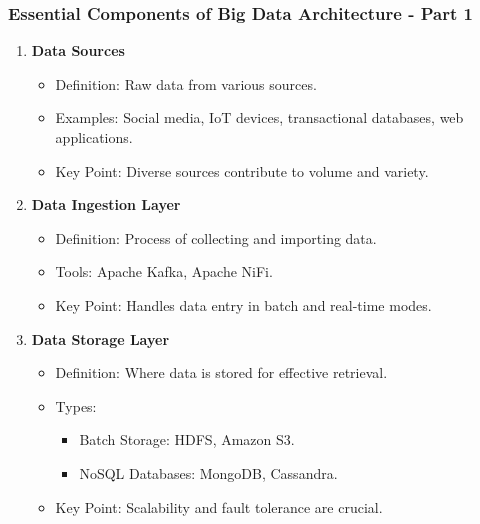 \documentclass[aspectratio=169]{beamer}
\begin{document}
\begin{frame}[fragile]
    \frametitle{Essential Components of Big Data Architecture - Part 1}
    \begin{enumerate}
        \item \textbf{Data Sources}
            \begin{itemize}
                \item Definition: Raw data from various sources.
                \item Examples: Social media, IoT devices, transactional databases, web applications.
                \item Key Point: Diverse sources contribute to volume and variety.
            \end{itemize}
        
        \item \textbf{Data Ingestion Layer}
            \begin{itemize}
                \item Definition: Process of collecting and importing data.
                \item Tools: Apache Kafka, Apache NiFi.
                \item Key Point: Handles data entry in batch and real-time modes.
            \end{itemize}
        
        \item \textbf{Data Storage Layer}
            \begin{itemize}
                \item Definition: Where data is stored for effective retrieval.
                \item Types: 
                    \begin{itemize}
                        \item Batch Storage: HDFS, Amazon S3.
                        \item NoSQL Databases: MongoDB, Cassandra.
                    \end{itemize}
                \item Key Point: Scalability and fault tolerance are crucial.
            \end{itemize}
    \end{enumerate}
\end{frame}
\end{document}
